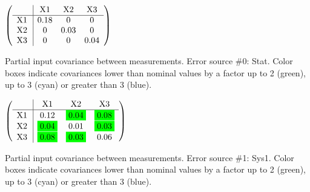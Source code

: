 \begin{table}[H]
\scriptsize
\begin{center}
\renewcommand{\arraystretch}{1.1}
\begin{math}\left(\begin{array}{c|ccc}
 & \mathrm{X1} & 
\mathrm{X2} & 
\mathrm{X3} \\
\hline
\mathrm{X1} \hspace*{2pt} &       0.18 &  0 &  0 \\
\mathrm{X2} \hspace*{2pt} &  0 &       0.03 &  0 \\
\mathrm{X3} \hspace*{2pt} &  0 &  0 &       0.04 \\
\end{array}\right)\end{math}
\caption{Partial input covariance between measurements. Error source \#0: Stat. Color boxes indicate covariances lower than nominal values by a factor up to 2 (green), up to 3 (cyan) or greater than 3 (blue).}
\renewcommand{\arraystretch}{1}
\end{center}
\end{table}
\begin{table}[H]
\scriptsize
\begin{center}
\renewcommand{\arraystretch}{1.1}
\begin{math}\left(\begin{array}{c|ccc}
 & \mathrm{X1} & 
\mathrm{X2} & 
\mathrm{X3} \\
\hline
\mathrm{X1} \hspace*{2pt} &       0.12 &  \colorbox{Green1}{$      0.04$} &  \colorbox{Green1}{$      0.08$} \\
\mathrm{X2} \hspace*{2pt} &  \colorbox{Green1}{$      0.04$} &       0.01 &  \colorbox{Green1}{$      0.03$} \\
\mathrm{X3} \hspace*{2pt} &  \colorbox{Green1}{$      0.08$} &  \colorbox{Green1}{$      0.03$} &       0.06 \\
\end{array}\right)\end{math}
\caption{Partial input covariance between measurements. Error source \#1: Sys1. Color boxes indicate covariances lower than nominal values by a factor up to 2 (green), up to 3 (cyan) or greater than 3 (blue).}
\renewcommand{\arraystretch}{1}
\end{center}
\end{table}
